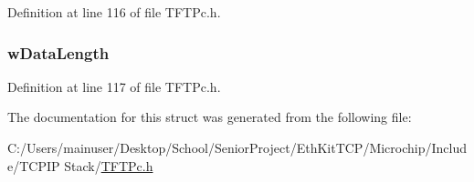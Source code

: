 Definition at line 116 of file T\+F\+T\+Pc.\+h.

\hypertarget{struct_t_f_t_p___c_h_u_n_k___d_e_s_c_r_i_p_t_o_r_a8edd715f61504cecee8a480602fabab4}{}
\subsubsection[{w\+Data\+Length}]{ w\+Data\+Length}\label{struct_t_f_t_p___c_h_u_n_k___d_e_s_c_r_i_p_t_o_r_a8edd715f61504cecee8a480602fabab4}


Definition at line 117 of file T\+F\+T\+Pc.\+h.



The documentation for this struct was generated from the following file\+:\begin{DoxyCompactItemize}
\item 
C\+:/\+Users/mainuser/\+Desktop/\+School/\+Senior\+Project/\+Eth\+Kit\+T\+C\+P/\+Microchip/\+Include/\+T\+C\+P\+I\+P Stack/\hyperlink{_t_f_t_pc_8h}{T\+F\+T\+Pc.\+h}\end{DoxyCompactItemize}

